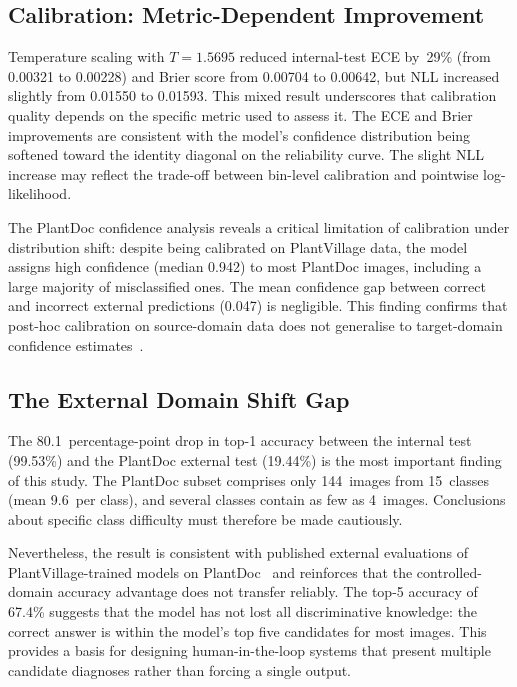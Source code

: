 \documentclass[conference]{IEEEtran}
\begin{document}
\subsection{Calibration: Metric-Dependent Improvement}

Temperature scaling with $T\!=\!1.5695$ reduced internal-test ECE
by~29\% (from 0.00321 to 0.00228) and Brier score from 0.00704 to
0.00642, but NLL increased slightly from 0.01550 to 0.01593.
This mixed result underscores that calibration quality depends on the
specific metric used to assess it. The ECE and Brier improvements are
consistent with the model's confidence distribution being softened
toward the identity diagonal on the reliability curve. The slight NLL
increase may reflect the trade-off between bin-level calibration and
pointwise log-likelihood.

The PlantDoc confidence analysis reveals a critical limitation of
calibration under distribution shift: despite being calibrated on
PlantVillage data, the model assigns high confidence (median 0.942)
to most PlantDoc images, including a large majority of misclassified
ones. The mean confidence gap between correct and incorrect external
predictions (0.047) is negligible. This finding confirms that
post-hoc calibration on source-domain data does not generalise to
target-domain confidence
estimates~\cite{ovadia2019can,guo2017calibration}.

\subsection{The External Domain Shift Gap}

The 80.1~percentage-point drop in top-1 accuracy between the internal
test (99.53\%) and the PlantDoc external test (19.44\%) is the most
important finding of this study. The PlantDoc subset comprises only
144~images from 15~classes (mean 9.6~per class), and several classes
contain as few as 4~images. Conclusions about specific class
difficulty must therefore be made cautiously.

Nevertheless, the result is consistent with published external
evaluations of PlantVillage-trained models on
PlantDoc~\cite{singh2020plantdoc} and reinforces
that the controlled-domain accuracy advantage does not transfer
reliably. The top-5 accuracy of 67.4\% suggests that the model has
not lost all discriminative knowledge: the correct answer is within
the model's top five candidates for most images. This provides a
basis for designing human-in-the-loop systems that present multiple
candidate diagnoses rather than forcing a single output.
\end{document}
